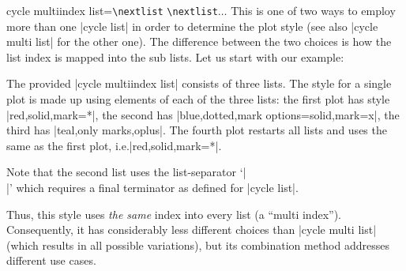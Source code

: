 \begin{pgfplotskey}{%
    cycle multiindex list=\texttt{\textbackslash nextlist}%
    \texttt{\textbackslash nextlist}$\ldots$
}
    This is one of two ways to employ more than one |cycle list| in order to
    determine the plot style (see also |cycle multi list| for the other one).
    The difference between the two choices is how the list index is mapped into
    the sub lists. Let us start with our example:
\begin{codeexample}[]
\end{codeexample}
    \noindent The provided |cycle multiindex list| consists of three lists. The
    style for a single plot is made up using elements of each of the three
    lists: the first plot has style |red,solid,mark=*|, the second has
    |blue,dotted,mark options={solid},mark=x|, the third has
    |teal,only marks,oplus|. The fourth plot restarts all lists and uses the
    same as the first plot, i.e.\@ |red,solid,mark=*|.

    Note that the second list uses the list-separator `|\\|' which requires a
    final terminator as defined for |cycle list|.

    Thus, this style uses \emph{the same} index into every list (a ``multi
    index''). Consequently, it has considerably less different choices than
    |cycle multi list| (which results in all possible variations), but its
    combination method addresses different use cases.


\end{pgfplotskey}
